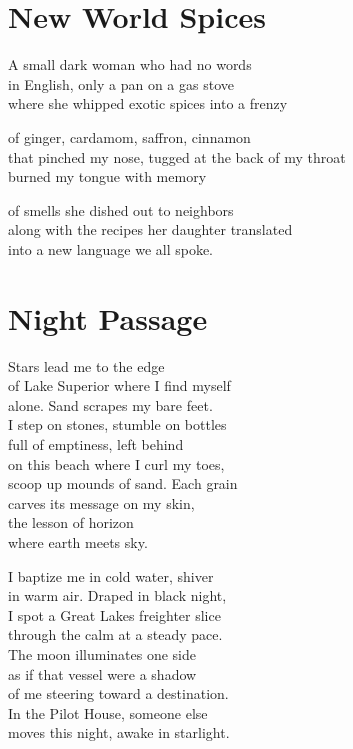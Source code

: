 \documentclass[twoside,10pt]{book}
\begin{document}
\clearpage
\section{New World Spices}

A small dark woman who had no words\\
in English, only a pan on a gas stove\\
where she whipped exotic spices into a frenzy

of ginger, cardamom, saffron, cinnamon\\
that pinched my nose, tugged at the back of my throat\\
burned my tongue with memory

of smells she dished out to neighbors\\
along with the recipes her daughter translated\\
into a new language we all spoke.


\clearpage
\section{Night Passage}

Stars lead me to the edge\\
of Lake Superior where I find myself\\
alone. Sand scrapes my bare feet.\\
I step on stones, stumble on bottles\\
full of emptiness, left behind\\
on this beach where I curl my toes,\\
scoop up mounds of sand. Each grain\\
carves its message on my skin,\\
the lesson of horizon\\
where earth meets sky.

I baptize me in cold water, shiver\\
in warm air. Draped in black night,\\
I spot a Great Lakes freighter slice\\
through the calm at a steady pace.\\
The moon illuminates one side\\
as if that vessel were a shadow\\
of me steering toward a destination.\\
In the Pilot House, someone else\\
moves this night, awake in starlight.
\end{document}
